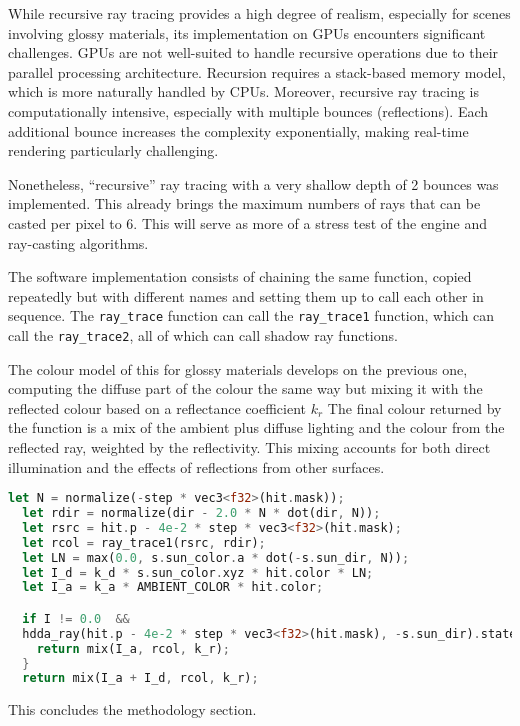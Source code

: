 While recursive ray tracing provides a high degree of realism, especially for scenes involving glossy materials, its implementation on GPUs encounters significant challenges. GPUs are not well-suited to handle recursive operations due to their parallel processing architecture. Recursion requires a stack-based memory model, which is more naturally handled by CPUs. Moreover, recursive ray tracing is computationally intensive, especially with multiple bounces (reflections). Each additional bounce increases the complexity exponentially, making real-time rendering particularly challenging.

Nonetheless, ``recursive'' ray tracing with a very shallow depth of 2 bounces was implemented. This already brings the maximum numbers of rays that can be casted per pixel to 6.
This will serve as more of a stress test of the engine and ray-casting algorithms.

The software implementation consists of chaining the same function, copied repeatedly but with different names and setting them up to call each other in sequence.
The \texttt{ray\_trace} function can call the \texttt{ray\_trace1} function, which can call the \texttt{ray\_trace2}, all of which can call shadow ray functions.

The colour model of this for glossy materials develops on the previous one, computing the diffuse part of the colour the same way but mixing it with the reflected colour based on a reflectance coefficient $k_{r}$
The final colour returned by the function is a mix of the ambient plus diffuse lighting and the colour from the reflected ray, weighted by the reflectivity.
This mixing accounts for both direct illumination and the effects of reflections from other surfaces.

\begin{lstlisting}[language=rust,caption={Glossy materials color model}, captionpos=b]
  let N = normalize(-step * vec3<f32>(hit.mask));
  let rdir = normalize(dir - 2.0 * N * dot(dir, N));
  let rsrc = hit.p - 4e-2 * step * vec3<f32>(hit.mask);
  let rcol = ray_trace1(rsrc, rdir);
  let LN = max(0.0, s.sun_color.a * dot(-s.sun_dir, N));
  let I_d = k_d * s.sun_color.xyz * hit.color * LN;
  let I_a = k_a * AMBIENT_COLOR * hit.color;

  if I != 0.0  &&
  hdda_ray(hit.p - 4e-2 * step * vec3<f32>(hit.mask), -s.sun_dir).state == 0u {
    return mix(I_a, rcol, k_r);
  }
  return mix(I_a + I_d, rcol, k_r);
\end{lstlisting}

This concludes the methodology section.


